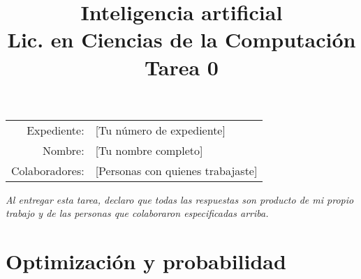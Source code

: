 \documentclass[11pt,letterpaper]{article}
\title{%
  \bfseries
  Inteligencia artificial\\%
  Lic. en Ciencias de la Computación\\%
  Tarea 0
}
\date{}
\begin{document}
\maketitle

\vspace{-2.5cm}
\begin{center}
  \begin{tabular}{rl}
    Expediente: & [Tu número de expediente] \\
    Nombre: & [Tu nombre completo] \\
    Colaboradores: & [Personas con quienes trabajaste]
  \end{tabular}
\end{center}

{\itshape Al entregar esta tarea, declaro que todas las respuestas son
  producto de mi propio trabajo y de las personas que colaboraron
  especificadas arriba.}



\section*{Optimización y probabilidad}
\end{document}
